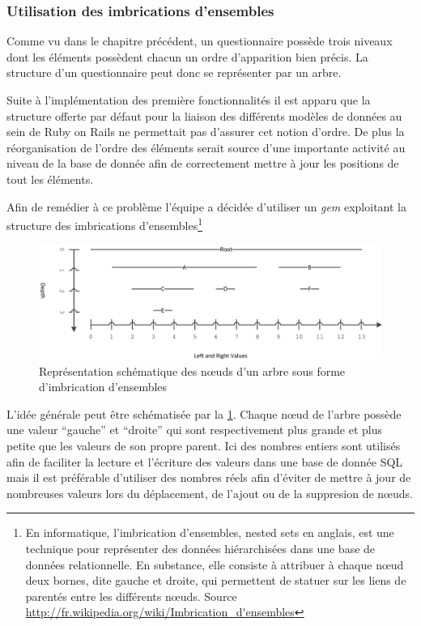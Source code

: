 \documentclass[12pt,a4paper]{book}
\begin{document}
\subsubsection{Utilisation des imbrications d'ensembles}
\label{sec.aws}

Comme vu dans le chapitre précédent, un questionnaire possède trois niveaux dont les éléments possèdent chacun un ordre d'apparition bien précis. La structure d'un questionnaire peut donc se représenter par un arbre.

Suite à l'implémentation des première fonctionnalités il est apparu que la structure offerte par défaut pour la liaison des différents modèles de données au sein de Ruby on Rails ne permettait pas d'assurer cet notion d'ordre. De plus la réorganisation de l'ordre des éléments serait source d'une importante activité au niveau de la base de donnée afin de correctement mettre à jour les positions de tout les éléments.

Afin de remédier à ce problème l'équipe a décidée d'utiliser un \textit{gem} exploitant la structure des imbrications d'ensembles\footnote{En informatique, l'imbrication d'ensembles, nested sets en anglais, est une technique pour représenter des données hiérarchisées dans une base de données relationnelle. En substance, elle consiste à attribuer à chaque nœud deux bornes, dite gauche et droite, qui permettent de statuer sur les liens de parentés entre les différents nœuds. Source \url{http://fr.wikipedia.org/wiki/Imbrication_d'ensembles}}

\begin{figure}[htp]
\centering
\includegraphics[scale=.12]{img/nested1.png}
\caption{Représentation schématique des nœuds d'un arbre sous forme d'imbrication d'ensembles}
\label{img:nested1}
\end{figure}

L'idée générale peut être schématisée par la \cref{img:nested1}. Chaque nœud de l'arbre possède une valeur ``gauche'' et ``droite'' qui sont respectivement plus grande et plus petite que les valeurs de son propre parent. Ici des nombres entiers sont utilisés afin de faciliter la lecture et l'écriture des valeurs dans une base de donnée SQL mais il est préférable d'utiliser des nombres réels afin d'éviter de mettre à jour de nombreuses valeurs lors du déplacement, de l'ajout ou de la suppresion de nœuds.
\end{document}
